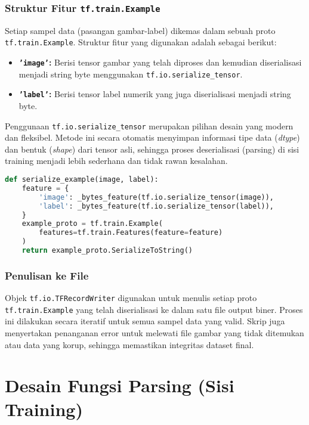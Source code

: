 \documentclass{article}
\begin{document}
\subsubsection{Struktur Fitur \texttt{tf.train.Example}}
Setiap sampel data (pasangan gambar-label) dikemas dalam sebuah proto \texttt{tf.train.Example}. Struktur fitur yang digunakan adalah sebagai berikut:
\begin{itemize}
    \item \textbf{\texttt{'image'}:} Berisi tensor gambar yang telah diproses dan kemudian diserialisasi menjadi string byte menggunakan \texttt{tf.io.serialize\_tensor}.
    \item \textbf{\texttt{'label'}:} Berisi tensor label numerik yang juga diserialisasi menjadi string byte.
\end{itemize}

Penggunaan \texttt{tf.io.serialize\_tensor} merupakan pilihan desain yang modern dan fleksibel. Metode ini secara otomatis menyimpan informasi tipe data (\textit{dtype}) dan bentuk (\textit{shape}) dari tensor asli, sehingga proses deserialisasi (parsing) di sisi training menjadi lebih sederhana dan tidak rawan kesalahan.

\begin{lstlisting}[language=Python, caption={Contoh fungsi serialisasi dalam skrip.}, label=lst:serialize]
def serialize_example(image, label):
    feature = {
        'image': _bytes_feature(tf.io.serialize_tensor(image)),
        'label': _bytes_feature(tf.io.serialize_tensor(label)),
    }
    example_proto = tf.train.Example(
        features=tf.train.Features(feature=feature)
    )
    return example_proto.SerializeToString()
\end{lstlisting}

\subsubsection{Penulisan ke File}
Objek \texttt{tf.io.TFRecordWriter} digunakan untuk menulis setiap proto \texttt{tf.train.Example} yang telah diserialisasi ke dalam satu file output biner. Proses ini dilakukan secara iteratif untuk semua sampel data yang valid. Skrip juga menyertakan penanganan error untuk melewati file gambar yang tidak ditemukan atau data yang korup, sehingga memastikan integritas dataset final.

\section{Desain Fungsi Parsing (Sisi Training)}
\end{document}
